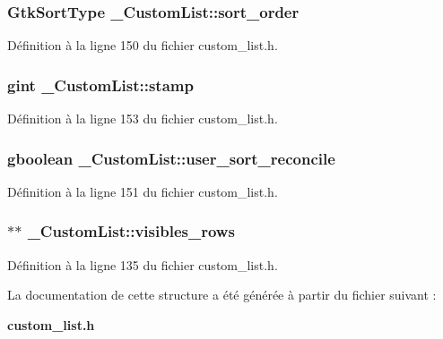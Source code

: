 \subsubsection[{sort\_\-order}]{\setlength{\rightskip}{0pt plus 5cm}GtkSortType {\bf \_\-CustomList::sort\_\-order}}\label{struct__CustomList_a9ef8c81501687072d17d5713c1ff0476}


Définition à la ligne 150 du fichier custom\_\-list.h.

\subsubsection[{stamp}]{\setlength{\rightskip}{0pt plus 5cm}gint {\bf \_\-CustomList::stamp}}\label{struct__CustomList_ad55c29483a410971d02c114ce4616fbe}


Définition à la ligne 153 du fichier custom\_\-list.h.

\subsubsection[{user\_\-sort\_\-reconcile}]{\setlength{\rightskip}{0pt plus 5cm}gboolean {\bf \_\-CustomList::user\_\-sort\_\-reconcile}}\label{struct__CustomList_a35b7a20830bfc3d9386338209569a72b}


Définition à la ligne 151 du fichier custom\_\-list.h.

\subsubsection[{visibles\_\-rows}]{$\ast$$\ast$ {\bf \_\-CustomList::visibles\_\-rows}}\label{struct__CustomList_a32b88e9bd528795509229555a505a8a9}


Définition à la ligne 135 du fichier custom\_\-list.h.



La documentation de cette structure a été générée à partir du fichier suivant :\begin{DoxyCompactItemize}
\item 
{\bf custom\_\-list.h}\end{DoxyCompactItemize}
